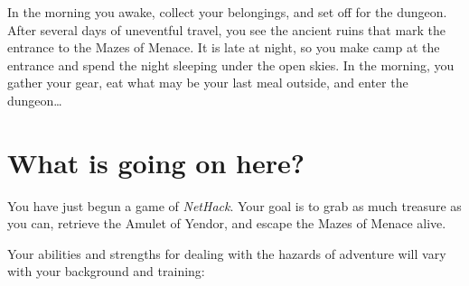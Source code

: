 \nd In the morning you awake, collect your belongings, and 
set off for the dungeon.  After several days of uneventful 
travel, you see the ancient ruins that mark the entrance to the 
Mazes of Menace.  It is late at night, so you make camp at the entrance 
and spend the night sleeping under the open skies.  In the morning, you 
gather your gear, eat what may be your last meal outside, and enter the 
dungeon\ldots

\section{What is going on here?}

You have just begun a game of {\it NetHack}.  Your goal is to grab as much
treasure as you can, retrieve the Amulet of Yendor, and escape the
Mazes of Menace alive.  

Your abilities and strengths for dealing with the hazards of adventure
will vary with your background and training:

